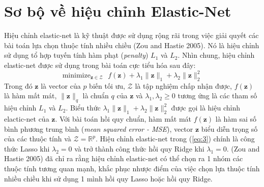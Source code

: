 \section{Sơ bộ về hiệu chỉnh Elastic-Net}
Hiệu chỉnh elastic-net là kỹ thuật được sử dụng rộng rãi trong việc giải quyết 
các bài toán lựa chọn thuộc tính nhiều chiều (Zou and Hastie 2005). Nó 
là hiệu chỉnh sử dụng tổ hợp tuyến tính hàm phạt (\textit{penalty})
$L_1$ và $L_2$. Nhìn chung, hiệu chỉnh elastic-net được sử dụng trong bài toán cực 
tiểu hóa sau đây:
\begin{equation}
    \label{eq:3}
    \text{minimize}_{\mathbf{z} \in \mathcal{Z}} \text{ }
    f(\mathbf{z}) + \lambda_1 \lVert \mathbf{z} \rVert_1
    + \lambda_2 \lVert \mathbf{z} \rVert_2^2
\end{equation}
Trong đó $\mathbf{z}$ là vector của $p$ biến tối ưu, $\mathcal{Z}$ là tập nghiệm 
chấp nhận được, $f(\mathbf{z})$ là hàm mất mát, $\lVert \mathbf{z} \rVert_q$ là 
chuẩn $q$ của $\mathbf{z}$ và $\lambda_1, \lambda_2 \geq 0$ tương ứng là các tham số hiệu 
chỉnh $L_1$ và $L_2$. Biểu thức $\lambda_1 \lVert \mathbf{z} \rVert_1 + \lambda_2 
\lVert \mathbf{z} \rVert_2^2$ được gọi là hiệu chỉnh elactic-net của $\mathbf{z}$.
Với bài toán hồi quy chuẩn, hàm mất mát $f(\mathbf{z})$ là hàm sai số bình phương trung bình
(\textit{mean squared error - MSE}), vector $\mathbf{z}$ biểu diễn trọng 
số của các thuộc tính và $\mathcal{Z} = \mathbb{R}^p$. Hiệu chỉnh elastic-net trong (\ref{eq:3}) chính là công thức Lasso khi $\lambda_2 = 0$ và trở thành công 
thức hồi quy Ridge khi $\lambda_1 = 0$. (Zou and Hastie 2005) đã chỉ ra rằng hiệu chỉnh 
elastic-net có thể chọn ra 1 nhóm các thuộc tính tương quan mạnh, khắc phục nhược điểm của việc chọn lựa thuộc tính nhiều chiều khi sử dụng 1 mình hồi quy Lasso 
hoặc hồi quy Ridge.